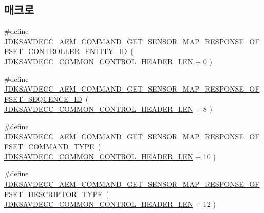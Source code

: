 \subsection*{매크로}
\begin{DoxyCompactItemize}
\item 
\#define \hyperlink{group__command__get__sensor__map__response_gad25cd6c17a0b79a25ca90d4d87e9c011}{J\+D\+K\+S\+A\+V\+D\+E\+C\+C\+\_\+\+A\+E\+M\+\_\+\+C\+O\+M\+M\+A\+N\+D\+\_\+\+G\+E\+T\+\_\+\+S\+E\+N\+S\+O\+R\+\_\+\+M\+A\+P\+\_\+\+R\+E\+S\+P\+O\+N\+S\+E\+\_\+\+O\+F\+F\+S\+E\+T\+\_\+\+C\+O\+N\+T\+R\+O\+L\+L\+E\+R\+\_\+\+E\+N\+T\+I\+T\+Y\+\_\+\+ID}~( \hyperlink{group__jdksavdecc__avtp__common__control__header_gaae84052886fb1bb42f3bc5f85b741dff}{J\+D\+K\+S\+A\+V\+D\+E\+C\+C\+\_\+\+C\+O\+M\+M\+O\+N\+\_\+\+C\+O\+N\+T\+R\+O\+L\+\_\+\+H\+E\+A\+D\+E\+R\+\_\+\+L\+EN} + 0 )
\item 
\#define \hyperlink{group__command__get__sensor__map__response_ga475bd9a30ba536419a2842c2886784d8}{J\+D\+K\+S\+A\+V\+D\+E\+C\+C\+\_\+\+A\+E\+M\+\_\+\+C\+O\+M\+M\+A\+N\+D\+\_\+\+G\+E\+T\+\_\+\+S\+E\+N\+S\+O\+R\+\_\+\+M\+A\+P\+\_\+\+R\+E\+S\+P\+O\+N\+S\+E\+\_\+\+O\+F\+F\+S\+E\+T\+\_\+\+S\+E\+Q\+U\+E\+N\+C\+E\+\_\+\+ID}~( \hyperlink{group__jdksavdecc__avtp__common__control__header_gaae84052886fb1bb42f3bc5f85b741dff}{J\+D\+K\+S\+A\+V\+D\+E\+C\+C\+\_\+\+C\+O\+M\+M\+O\+N\+\_\+\+C\+O\+N\+T\+R\+O\+L\+\_\+\+H\+E\+A\+D\+E\+R\+\_\+\+L\+EN} + 8 )
\item 
\#define \hyperlink{group__command__get__sensor__map__response_ga9f3e82c7a969e94ce42186229698253e}{J\+D\+K\+S\+A\+V\+D\+E\+C\+C\+\_\+\+A\+E\+M\+\_\+\+C\+O\+M\+M\+A\+N\+D\+\_\+\+G\+E\+T\+\_\+\+S\+E\+N\+S\+O\+R\+\_\+\+M\+A\+P\+\_\+\+R\+E\+S\+P\+O\+N\+S\+E\+\_\+\+O\+F\+F\+S\+E\+T\+\_\+\+C\+O\+M\+M\+A\+N\+D\+\_\+\+T\+Y\+PE}~( \hyperlink{group__jdksavdecc__avtp__common__control__header_gaae84052886fb1bb42f3bc5f85b741dff}{J\+D\+K\+S\+A\+V\+D\+E\+C\+C\+\_\+\+C\+O\+M\+M\+O\+N\+\_\+\+C\+O\+N\+T\+R\+O\+L\+\_\+\+H\+E\+A\+D\+E\+R\+\_\+\+L\+EN} + 10 )
\item 
\#define \hyperlink{group__command__get__sensor__map__response_ga428bc8f8f73fb6abd6ae9af55b8d41f4}{J\+D\+K\+S\+A\+V\+D\+E\+C\+C\+\_\+\+A\+E\+M\+\_\+\+C\+O\+M\+M\+A\+N\+D\+\_\+\+G\+E\+T\+\_\+\+S\+E\+N\+S\+O\+R\+\_\+\+M\+A\+P\+\_\+\+R\+E\+S\+P\+O\+N\+S\+E\+\_\+\+O\+F\+F\+S\+E\+T\+\_\+\+D\+E\+S\+C\+R\+I\+P\+T\+O\+R\+\_\+\+T\+Y\+PE}~( \hyperlink{group__jdksavdecc__avtp__common__control__header_gaae84052886fb1bb42f3bc5f85b741dff}{J\+D\+K\+S\+A\+V\+D\+E\+C\+C\+\_\+\+C\+O\+M\+M\+O\+N\+\_\+\+C\+O\+N\+T\+R\+O\+L\+\_\+\+H\+E\+A\+D\+E\+R\+\_\+\+L\+EN} + 12 )

\end{DoxyCompactItemize}
